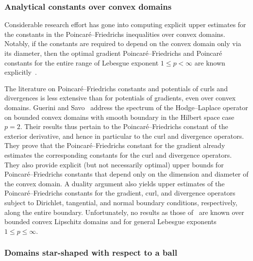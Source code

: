 \documentclass[10pt,a4paper]{article}
\begin{document}
\subsubsection{Analytical constants over convex domains}

Considerable research effort has gone into computing explicit upper estimates for the constants in the Poincar\'e--Friedrichs inequalities over convex domains. 
Notably, if the constants are required to depend on the convex domain only via its diameter, 
then the optimal gradient Poincar\'e--Friedrichs and Poincar\'e constants for the entire range of Lebesgue exponent $1 \leq p < \infty$ are known explicitly~\cite{Pay_Wei_Poin_conv_60,bebendorf2003note,acosta2004optimal,esposito2013poincare,ferone2012remark}.

The literature on Poincar\'e--Friedrichs constants and potentials of curls and divergences is less extensive than for potentials of gradients, even over convex domains.
Guerini and Savo~\cite{guerini2004eigenvalue} address the spectrum of the Hodge--Laplace operator on bounded convex domains with smooth boundary in the Hilbert space case $p=2$. Their results thus pertain to the Poincar\'e--Friedrichs constant of the exterior derivative, and hence in particular to the curl and divergence operators.
They prove that the Poincar\'e--Friedrichs constant for the gradient already estimates the corresponding constants for the curl and divergence operators. 
They also provide explicit (but not necessarily optimal) upper bounds for Poincar\'e--Friedrichs constants that depend only on the dimension and diameter of the convex domain. 
A duality argument also yields upper estimates of the Poincar\'e--Friedrichs constants for the gradient, curl, and divergence operators subject to Dirichlet, tangential, and normal boundary conditions, respectively, along the entire boundary. 
Unfortunately, no results as those of~\cite{guerini2004eigenvalue} are known over bounded convex Lipschitz domains and for general Lebesgue exponents $1 \leq p \leq \infty$. 

\subsubsection{Domains star-shaped with respect to a ball}
\end{document}
